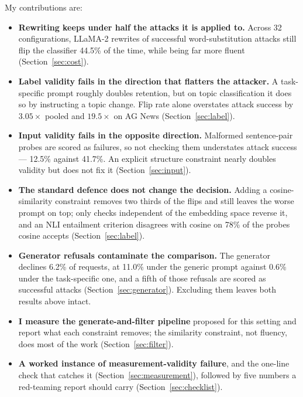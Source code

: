 \documentclass[11pt]{article}
\begin{document}
My contributions are:

\begin{itemize}
\item \textbf{Rewriting keeps under half the attacks it is applied to.} Across 32
      configurations, LLaMA-2 rewrites of successful word-substitution attacks
      still flip the classifier 44.5\% of the time, while being far more fluent
      (Section~\ref{sec:cost}).
\item \textbf{Label validity fails in the direction that flatters the attacker.}
      A task-specific prompt roughly doubles retention, but on topic
      classification it does so by instructing a topic change. Flip rate alone
      overstates attack success by $3.05\times$ pooled and $19.5\times$ on AG
      News (Section~\ref{sec:label}).
\item \textbf{Input validity fails in the opposite direction.} Malformed
      sentence-pair probes are scored as failures, so not checking them
      understates attack success --- 12.5\% against 41.7\%. An explicit structure
      constraint nearly doubles validity but does not fix it
      (Section~\ref{sec:input}).
\item \textbf{The standard defence does not change the decision.} Adding a
      cosine-similarity constraint removes two thirds of the flips and still
      leaves the worse prompt on top; only checks independent of the embedding
      space reverse it, and an NLI entailment criterion disagrees with cosine on
      78\% of the probes cosine accepts (Section~\ref{sec:label}).
\item \textbf{Generator refusals contaminate the comparison.} The generator
      declines 6.2\% of requests, at 11.0\% under the generic prompt against 0.6\%
      under the task-specific one, and a fifth of those refusals are scored as
      successful attacks (Section~\ref{sec:generator}). Excluding them leaves both
      results above intact.
\item \textbf{I measure the generate-and-filter pipeline} proposed for this
      setting and report what each constraint removes; the similarity constraint,
      not fluency, does most of the work (Section~\ref{sec:filter}).
\item \textbf{A worked instance of measurement-validity failure}, and the
      one-line check that catches it (Section~\ref{sec:measurement}), followed by
      five numbers a red-teaming report should carry
      (Section~\ref{sec:checklist}).
\end{itemize}
\end{document}
